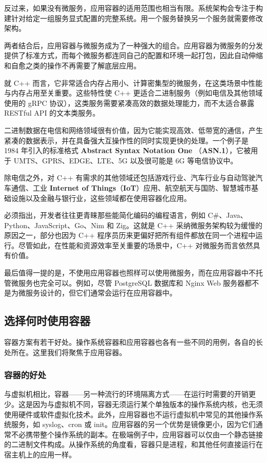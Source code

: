反过来，如果没有微服务，应用容器的适用范围也相当有限。系统架构会专注于构建针对给定一组服务显式配置的完整系统。用一个服务替换另一个服务就需要修改架构。

两者结合后，应用容器与微服务成为了一种强大的组合。应用容器为微服务的分发提供了标准方式，而每个微服务都连同自己的配置和环境一起打包，因此自动伸缩和自愈之类的操作不再需要了解底层应用。

就 C++ 而言，它非常适合内存占用小、计算密集型的微服务，在这类场景中性能与内存占用至关重要。这些特性使 C++ 更适合二进制服务（例如电信及其他领域使用的 gRPC 协议），这类服务需要紧凑高效的数据处理能力，而不太适合暴露 RESTful API 的文本类服务。

\label{idx:1722}
二进制数据在电信和网络领域很有价值，因为它能实现高效、低带宽的通信，产生紧凑的数据表示，并在具备强大互操作性的同时实现更快的处理。一个例子是 1984 年引入的标准格式 \textbf{Abstract Syntax Notation One }（\textbf{ASN.1}），它被用于 UMTS、GPRS、EDGE、LTE、5G 以及很可能是 6G 等电信协议中。

\label{idx:1723}
\label{idx:1724}
除电信之外，对 C++ 有需求的其他领域还包括游戏行业、汽车行业与自动驾驶汽车通信、工业 \textbf{Internet of Things}（\textbf{IoT}）应用、航空航天与国防、智慧城市基础设施以及金融与银行业，这些领域都在使用容器化应用。

必须指出，开发者往往更青睐那些能简化编码的编程语言，例如 C\#、Java、Python、JavaScript、Go、Nim 和 Zig。这就是 C++ 采纳微服务架构较为缓慢的原因之一，部分也因为 C++ 程序员历来更偏好把所有组件都放在同一个进程中运行。尽管如此，在性能和资源效率至关重要的场景中，C++ 对微服务而言依然具有价值。

\label{idx:1725}
最后值得一提的是，不使用应用容器也照样可以使用微服务，而在应用容器中不托管微服务也完全可以。例如，尽管 PostgreSQL 数据库和 Nginx Web 服务器都不是为微服务设计的，但它们通常会运行在应用容器中。

\subsection{选择何时使用容器}

\label{idx:1726}
容器方案有若干好处。操作系统容器和应用容器也各有一些不同的用例，各自的长处所在。这里我们将聚焦于应用容器。

\subsubsection{容器的好处}

\label{idx:1727}
与虚拟机相比，容器——另一种流行的环境隔离方式——在运行时需要的开销更少。这是因为与虚拟机不同，容器无须运行某个单独版本的操作系统内核，也无须使用硬件或软件虚拟化技术。此外，应用容器也不运行虚拟机中常见的其他操作系统服务，如 syslog、cron 或 init。应用容器的另一个优势是镜像更小，因为它们通常不必携带整个操作系统的副本。在极端例子中，应用容器可以仅由一个静态链接的二进制文件构成。从操作系统的角度看，容器只是进程，和其他任何直接运行在宿主机上的应用一样。

